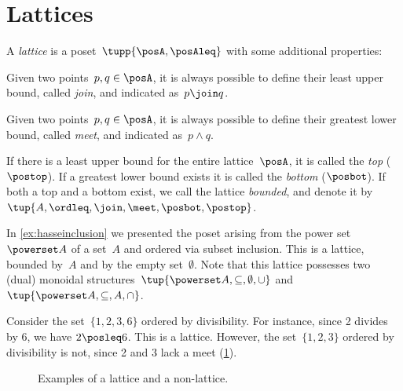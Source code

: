 

\section{Lattices}

\begin{definition}[Lattice]
  \label{def:lattice}
  A \emph{lattice} is a poset~$\tupp{\posA,\posAleq}$ with some additional properties:
  \begin{compactenum}
    \item Given two points~$p, q \in \posA$, it is always possible to define their least upper bound, called \emph{join}, and indicated as~$p \join q$.
    \item Given two points~$p, q \in \posA$, it is always possible to define their greatest lower bound, called \emph{meet}, and indicated as~$p \wedge q$.
  \end{compactenum}
\end{definition}


\begin{remark}
  \label{def:top}
  \label{def:bot}
  If there is a least upper bound for the entire lattice~$\posA$, it is called
  the \emph{top} ($\postop$). If a greatest lower bound exists it is called the \emph{bottom} ($\posbot$). If both a top and a bottom exist, we call the lattice \emph{bounded}, and denote it by~$\tup{A,\ordleq,\join,\meet,\posbot,\postop}$.
\end{remark}

\begin{example}
  In \cref{ex:hasseinclusion} we presented the poset arising from the power set~$\powerset A$ of a set~$A$ and ordered via subset inclusion. This is a lattice, bounded by~$A$ and by the empty set~$\emptyset$. Note that this lattice possesses two (dual) monoidal structures~$\tup{\powerset A,\subseteq,\emptyset,\cup}$ and~$\tup{\powerset A,\subseteq,A,\cap}$.
\end{example}

\begin{example}
  Consider the set~$\{1,2,3,6\}$ ordered by divisibility. For instance, since 2 divides by 6, we have $2\posleq 6$. This is a lattice. However, the set~$\{1,2,3\}$ ordered by divisibility is not, since 2 and 3 lack a meet (\cref{fig:exlattice}).
  \begin{figure}[h!]
    \begin{center}
    \end{center}
    \caption{Examples of a lattice and a non-lattice. }
    \label{fig:exlattice}
  \end{figure}
\end{example}


